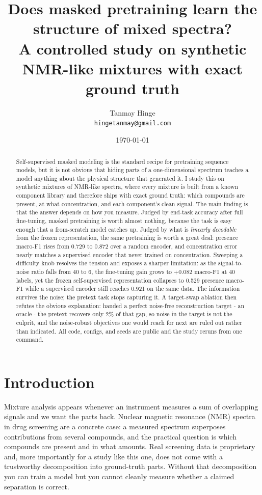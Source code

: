 \documentclass[11pt]{article}
\title{\textbf{Does masked pretraining learn the structure of mixed spectra?}\\
\large A controlled study on synthetic NMR-like mixtures with exact ground truth}
\author{Tanmay Hinge\\\small \texttt{hingetanmay@gmail.com}}
\date{\today}
\begin{document}
\maketitle

\begin{abstract}
\noindent
Self-supervised masked modeling is the standard recipe for pretraining sequence models, but
it is not obvious that hiding parts of a one-dimensional spectrum teaches a model anything
about the physical structure that generated it. I study this on synthetic mixtures of
NMR-like spectra, where every mixture is built from a known component library and therefore
ships with exact ground truth: which compounds are present, at what concentration, and each
component's clean signal. The main finding is that the answer depends on how you measure.
Judged by end-task accuracy after full fine-tuning, masked pretraining is worth almost
nothing, because the task is easy enough that a from-scratch model catches up. Judged by what
is \emph{linearly decodable} from the frozen representation, the same pretraining is worth a
great deal: presence macro-F1 rises from 0.729 to 0.872 over a random encoder, and
concentration error nearly matches a supervised encoder that never trained on concentration.
Sweeping a difficulty knob resolves the tension and exposes a sharper limitation: as the
signal-to-noise ratio falls from 40 to 6, the fine-tuning gain grows to $+0.082$ macro-F1 at
40 labels, yet the frozen self-supervised representation collapses to 0.529 presence macro-F1
while a supervised encoder still reaches 0.921 on the same data. The information survives the
noise; the pretext task stops capturing it. A target-swap ablation then refutes the obvious
explanation: handed a perfect noise-free reconstruction target - an oracle - the pretext
recovers only 2\% of that gap, so noise in the target is not the culprit, and the noise-robust
objectives one would reach for next are ruled out rather than indicated. All code, configs, and
seeds are public and the study reruns from one command.
\end{abstract}

\section{Introduction}

Mixture analysis appears whenever an instrument measures a sum of overlapping signals and we
want the parts back. Nuclear magnetic resonance (NMR) spectra in drug screening are a
concrete case: a measured spectrum superposes contributions from several compounds, and the
practical question is which compounds are present and in what amounts. Real screening data is
proprietary and, more importantly for a study like this one, does not come with a trustworthy
decomposition into ground-truth parts. Without that decomposition you can train a model but
you cannot cleanly measure whether a claimed separation is correct.
\end{document}
